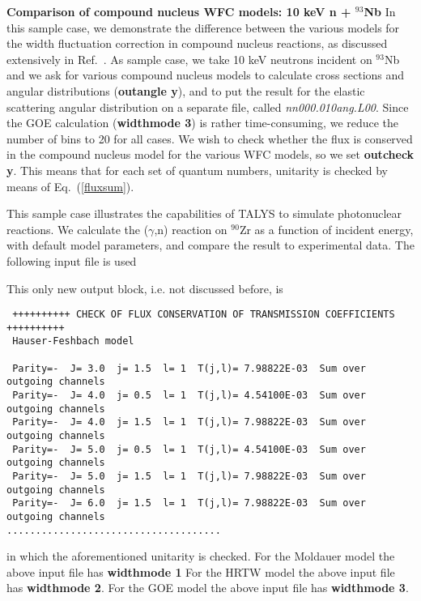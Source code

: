 \begin{samplecase}
{\bf Comparison of compound nucleus WFC models: 10 keV n + ${}^{93}$Nb}\newline
In this sample case, we demonstrate the difference between the various models
for the width fluctuation correction in compound nucleus reactions, as
discussed extensively in Ref.~\cite{Hilaire2003}.
As sample case, we take 10 keV neutrons incident on ${}^{93}$Nb and
we ask for various compound nucleus models to
calculate cross sections and angular distributions ({\bf outangle y}), and to
put the result for the elastic scattering angular distribution on a separate
file, called {\em nn000.010ang.L00}.
Since the GOE calculation ({\bf widthmode 3}) is rather
time-consuming, we reduce the number of bins to 20 for all cases.
We wish to check whether the flux is
conserved in the compound nucleus model for the various WFC models, so we
set {\bf outcheck y}. This means that
for each set of quantum numbers, unitarity is checked by means of
Eq.~(\ref{fluxsum}).

This sample case illustrates the capabilities of TALYS to simulate photonuclear
reactions. We calculate the ($\gamma$,n) reaction on ${}^{90}$Zr as a function
of incident energy, with default model parameters, and compare the result to
experimental data.
The following input file is used


This only new output block, i.e. not discussed before, is

{\small \begin{verbatim}
 ++++++++++ CHECK OF FLUX CONSERVATION OF TRANSMISSION COEFFICIENTS ++++++++++
 Hauser-Feshbach model

 Parity=-  J= 3.0  j= 1.5  l= 1  T(j,l)= 7.98822E-03  Sum over outgoing channels
 Parity=-  J= 4.0  j= 0.5  l= 1  T(j,l)= 4.54100E-03  Sum over outgoing channels
 Parity=-  J= 4.0  j= 1.5  l= 1  T(j,l)= 7.98822E-03  Sum over outgoing channels
 Parity=-  J= 5.0  j= 0.5  l= 1  T(j,l)= 4.54100E-03  Sum over outgoing channels
 Parity=-  J= 5.0  j= 1.5  l= 1  T(j,l)= 7.98822E-03  Sum over outgoing channels
 Parity=-  J= 6.0  j= 1.5  l= 1  T(j,l)= 7.98822E-03  Sum over outgoing channels
.....................................
\end{verbatim} } \renewcommand{\baselinestretch}{1.07}\small\normalsize
\noindent
in which the aforementioned unitarity is checked.
For the Moldauer model the above input file has {\bf widthmode 1}
For the HRTW model the above input file has {\bf widthmode 2}.
For the GOE model the above input file has {\bf widthmode 3}.


\end{samplecase}
